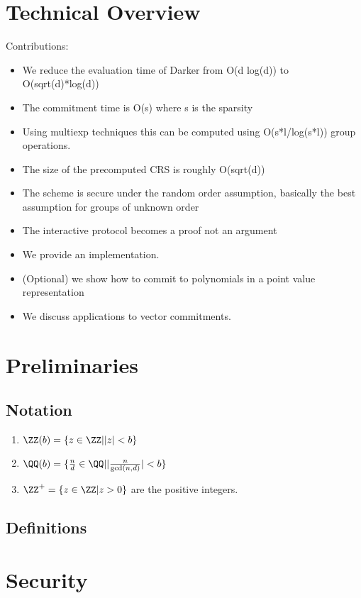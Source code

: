 

\section{Technical Overview}
Contributions:
\begin{itemize}
	\item We reduce the evaluation time of Darker from O(d log(d)) to O(sqrt(d)*log(d))
	\item The commitment time is O(s) where s is the sparsity 
	\item Using multiexp techniques this can be computed using O(s*l/log(s*l)) group operations. 
	\item The size of the precomputed CRS is roughly O(sqrt(d))
	\item The scheme is secure under the random order assumption, basically the best assumption for groups of unknown order
	\item The interactive protocol becomes a proof not an argument
	\item We provide an implementation.
	\item (Optional) we show how to commit to polynomials in a point value representation
	\item We discuss applications to vector commitments. 
\end{itemize}

\section{Preliminaries}
\subsection{Notation}
\begin{enumerate}
	\item $\ZZ(b)=\{ z \in \ZZ | |z|<b\}$
	\item $\QQ(b)=\{\frac{n}{d} \in \QQ | |\frac{n}{\gcd(n,d)}|< b\}$
	\item $\ZZ^+=\{z \in \ZZ | z>0\}$ are the positive integers.
	\end{enumerate}
	
\subsection{Definitions}

\section{Security}

